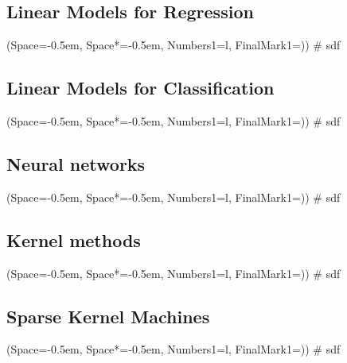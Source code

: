\documentclass[12pt, a4paper]{article}
\newcommand{\listSpace}{-0.5em}%
\begin{document}
\subsection{Linear Models for Regression}
\begin{easylist}[itemize]
	\ListProperties(Space=\listSpace, Space*=\listSpace, Numbers1=l, FinalMark1={)})
	# sdf
\end{easylist}

\subsection{Linear Models for Classification}
\begin{easylist}[itemize]
	\ListProperties(Space=\listSpace, Space*=\listSpace, Numbers1=l, FinalMark1={)})
	# sdf
\end{easylist}

\subsection{Neural networks}
\begin{easylist}[itemize]
	\ListProperties(Space=\listSpace, Space*=\listSpace, Numbers1=l, FinalMark1={)})
	# sdf
\end{easylist}

\subsection{Kernel methods}
\begin{easylist}[itemize]
	\ListProperties(Space=\listSpace, Space*=\listSpace, Numbers1=l, FinalMark1={)})
	# sdf
\end{easylist}

\subsection{Sparse Kernel Machines}
\begin{easylist}[itemize]
	\ListProperties(Space=\listSpace, Space*=\listSpace, Numbers1=l, FinalMark1={)})
	# sdf
\end{easylist}

\end{document}
